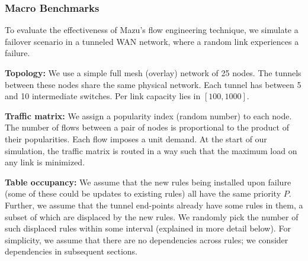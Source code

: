 
\subsubsection{Macro Benchmarks}%
\label{s:fe_eval}

To evaluate the effectiveness of Mazu's flow engineering technique, we simulate a failover scenario in a tunneled WAN network, where a random link experiences a failure. 

{\bf Topology: } We use a simple full mesh (overlay) network of 25 nodes.  The tunnels between these nodes share the same physical network. Each tunnel has between 5 and 10 intermediate switches. Per link capacity lies in $[100,1000]$.

{\bf Traffic matrix:} We assign a popularity index (random number) to each node. The number of flows between a pair of nodes is proportional to the product of their popularities. Each flow imposes a unit demand. At the start of our simulation, the traffic matrix is routed in a way such that the maximum load on any link is minimized.

{\bf Table occupancy:} We assume that the new rules being installed upon failure (some of these could be updates to existing rules) all have the same priority $P$. Further, we assume that the tunnel end-points already have some rules in them, a subset of which are displaced by the new rules. We randomly pick the number of such displaced rules within some interval (explained in more detail below). For simplicity, we assume that there are no dependencies across rules; we consider dependencies in subsequent sections.

